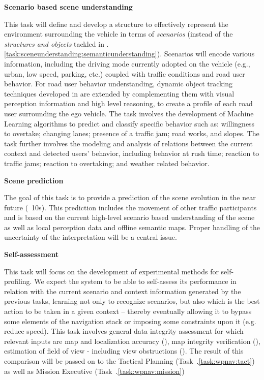 {\begin{tasks}{\WPSceneUnderstandingNo}
\item  {\bf Scenario based scene understanding}
  \taskpartners{\PRAGUE}{\VW, \CLUJ}

This task will define and develop a structure to effectively represent the environment surrounding the vehicle in terms of \emph{scenarios} (instead of the \emph{structures and objects} tackled in \WPSceneUnderstandingNo.\ref{task:sceneunderstanding:semanticunderstanding}). Scenarios will encode various information, including the driving mode currently adopted on the vehicle (e.g., urban, low speed, parking, etc.) coupled with traffic conditions and road user behavior. For road user behavior understanding, dynamic object tracking techniques developed in \WPPerception are extended by complementing them with visual perception information and high level reasoning, to create a profile of each road user surrounding the ego vehicle. The task involves the development of Machine Learning algorithms to predict and classify specific behavior such as: willingness to overtake; changing lanes; presence of a traffic jam; road works, and slopes. The task further involves the modeling and analysis of relations between the current context and detected users' behavior, including behavior at rush time; reaction to traffic jams; reaction to overtaking; and weather related behavior.

\item  {\bf Scene prediction}
  \taskpartners{\PRAGUE}{\VW}

The goal of this task is to provide a prediction of the scene evolution in the near future (~10s). This prediction includes the movement of other traffic participants and is based on the current high-level scenario based understanding of the scene as well as local perception data and offline semantic maps. Proper handling of the uncertainty of the interpretation will be a central issue.

\item  {\bf Self-assessment}
  \taskpartners{\PRAGUE}{\VW}

This task will focus on the development of experimental methods for self-profiling. We expect the system to be able to self-assess its performance in relation with the current scenario and context information generated by the previous tasks, learning not only to recognize scenarios, but also which is the best action to be taken in a given context -- thereby eventually allowing it to bypass some elements of the navigation stack or imposing some constraints upon it (e.g. reduce speed). This task involves general data integrity assessment for which relevant inputs are map and localization accuracy (\WPMapping), map integrity verification (\WPPerception), estimation of field of view - including view obstructions (\WPPerception). The result of this comparison will be passed on to the Tactical Planning (Task~\WPNavigation.\ref{task:wpnav:tact}) as well as Mission Executive (Task~\WPNavigation.\ref{task:wpnav:mission})


\end{tasks}}

